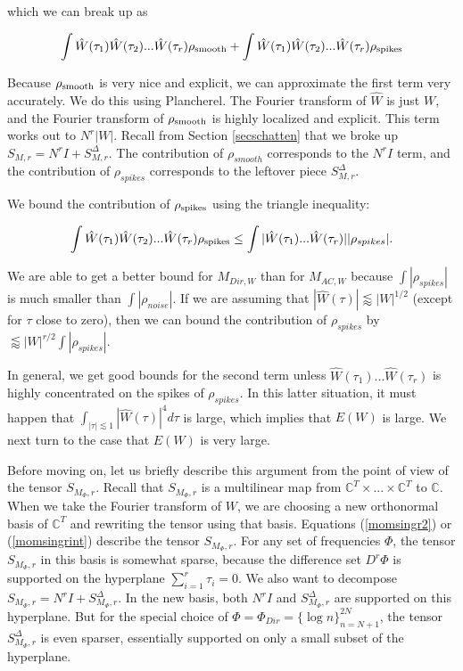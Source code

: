 \documentclass{amsart}
\newcommand{\CC}{\mathbb{C}}
\begin{document}
which we can break up as

\begin{equation}  \int  \hat W(\tau_1) \hat W(\tau_2) ... \hat W(\tau_r) \rho_{\textrm{smooth}} + \int  \hat W(\tau_1) \hat W(\tau_2) ... \hat W(\tau_r) \rho_{\textrm{spikes}}  \end{equation}

Because $\rho_{\textrm{smooth}}$ is very nice and explicit, we can approximate the first term very accurately.  We do this using Plancherel.  The Fourier transform of $\hat W$ is just $W$, and the Fourier transform of $\rho_{\textrm{smooth}}$ is highly localized and explicit.  This term works out to $N^r |W|$.   Recall from Section \ref{secschatten} that we broke up $S_{M, r}= N^r I + S^\Delta_{M, r}$.  The contribution of $\rho_{smooth}$ corresponds to the $N^r I$ term, and the contribution of $\rho_{spikes}$ corresponds to the leftover piece $S^\Delta_{M, r}$.  

We bound the contribution of $\rho_{\textrm{spikes}}$ using the triangle inequality:

$$ \int  \hat W(\tau_1) \hat W(\tau_2) ... \hat W(\tau_r) \rho_{\textrm{spikes}} \le \int |\hat W(\tau_1) ... \hat W(\tau_r)| |\rho_{spikes}|. $$

\noindent We are able to get a better bound for $M_{Dir, W}$ than for $M_{AC, W}$ because $\int |\rho_{spikes}|$ is much smaller than $\int |\rho_{noise}|$.  If we are assuming that $|\hat W(\tau)| \lessapprox |W|^{1/2}$ (except for $\tau$ close to zero), then we can bound the contribution of $\rho_{spikes}$ by $\lessapprox |W|^{r/2} \int |\rho_{spikes}|$.  


In general, we get good bounds for the second term unless $\hat W(\tau_1) ... \hat W(\tau_r)$ is highly concentrated on the spikes of $\rho_{spikes}$.  In this latter situation, it must happen that $\int_{|\tau| \lesssim 1}  |\hat W(\tau)|^4 d\tau$ is large, which implies that $E(W)$ is large.  We next turn to the case that $E(W)$ is very large.

Before moving on,  let us briefly describe this argument from the point of view of the tensor $S_{M_\Phi, r}$.   Recall that $S_{M_\Phi, r}$ is a multilinear map from $\CC^T \times ... \times \CC^T$ to $\CC$.   When we take the Fourier transform of $W$,  we are choosing a new orthonormal basis of $\CC^T$ and rewriting the tensor using that basis.   Equations (\ref{momsingr2}) or (\ref{momsingrint}) describe the tensor $S_{M_\Phi, r}$.   For any set of frequencies $\Phi$,  the tensor $S_{M_\Phi, r}$ in this basis is somewhat sparse,  because the difference set $D^r \Phi$ is supported on the hyperplane $\sum_{i = 1}^r \tau_i = 0$.   We also want to decompose $S_{M_\Phi,r} = N^r I + S^\Delta_{M_\Phi, r}$.   In the new basis,  both $N^r I$ and $S^\Delta_{M_\Phi, r}$ are supported on this hyperplane.   But for the special choice of $\Phi = \Phi_{Dir} =  \{ \log n \}_{n=N+1}^{2N}$,  the tensor $S^\Delta_{M_\Phi, r}$ is even sparser,  essentially supported on only a small subset of the hyperplane.
\end{document}
